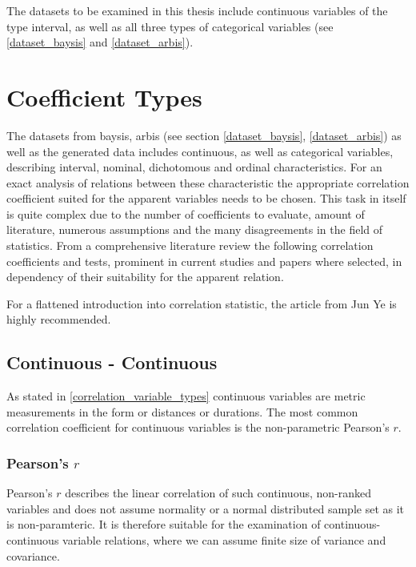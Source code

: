 \documentclass[a4paper,12pt]{report}
\begin{document}
The datasets to be examined in this thesis include continuous variables of the type interval, as well as all three types of categorical variables (see \ref{dataset_baysis} and \ref{dataset_arbis}).

\section{Coefficient Types}
\label{correlation_coefficient_types}
The datasets from \acrshort{baysis}, \acrshort{arbis} (see section \ref{dataset_baysis}, \ref{dataset_arbis}) as well as the generated data includes continuous, as well as categorical variables, describing interval, nominal, dichotomous and ordinal characteristics. For an exact analysis of relations between these characteristic the appropriate correlation coefficient suited for the apparent variables needs to be chosen. This task in itself is quite complex due to the number of coefficients to evaluate, amount of literature, numerous assumptions and the many disagreements in the field of statistics. From a comprehensive literature review the following correlation coefficients and tests, prominent in current studies and papers where selected, in dependency of their suitability for the apparent relation.

For a flattened introduction into correlation statistic, the article from Jun Ye \cite{Yun2020} is highly recommended. %

\subsection{Continuous - Continuous}
\label{correlation_pearson}

As stated in \ref{correlation_variable_types} continuous variables are metric measurements in the form or distances or durations. The most common correlation coefficient for continuous variables is the non-parametric Pearson's $r$.

\subsubsection{Pearson's $r$}


Pearson's $r$ describes the linear correlation of such continuous, non-ranked variables and does not assume normality or a normal distributed sample set as it is non-paramteric. It is therefore suitable for the examination of continuous-continuous variable relations, where we can assume finite size of variance and covariance. \cite{BenestyChenHuang2009,Sulthan2018}
 
\end{document}
